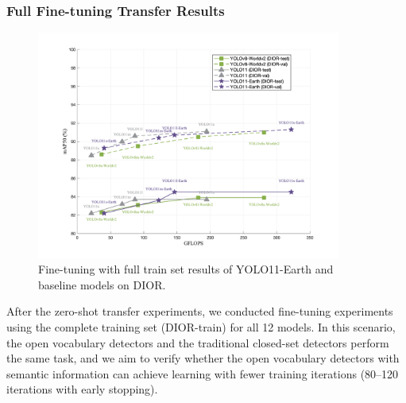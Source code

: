\documentclass{article}
\begin{document}
\subsubsection{Full Fine-tuning Transfer Results}
\begin{figure}[htbp]
    \centering
    \includegraphics[width=10cm]{../image/7.png}
    \caption{Fine-tuning with full train set results of YOLO11-Earth and baseline models on DIOR.}
\end{figure}
After the zero-shot transfer experiments, we conducted fine-tuning experiments using the complete training set 
(DIOR-train) for all 12 models. In this scenario, the open vocabulary detectors and the traditional closed-set 
detectors perform the same task, and we aim to verify whether the open vocabulary detectors with semantic 
information can achieve learning with fewer training iterations (80–120 iterations with early stopping).
\end{document}
